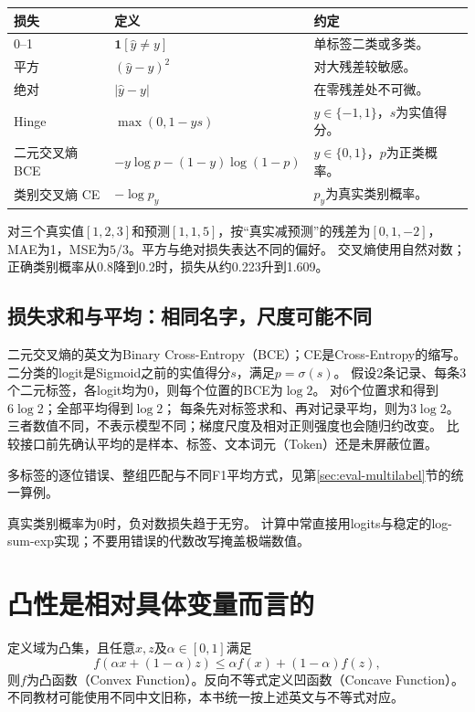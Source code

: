 \begin{center}
\begin{tabularx}{\textwidth}{P{29mm}P{62mm}Y}
\toprule
损失 & 定义 & 约定\\
--1 & $\mathbf1[\hat y\ne y]$ & 单标签二类或多类。\\
平方 & $(\hat y-y)^2$ & 对大残差较敏感。\\
绝对 & $|\hat y-y|$ & 在零残差处不可微。\\
Hinge & $\max(0,1-ys)$ & $y\in\{-1,1\}$，$s$为实值得分。\\
二元交叉熵 BCE & $-y\log p-(1-y)\log(1-p)$ & $y\in\{0,1\}$，$p$为正类概率。\\
类别交叉熵 CE & $-\log p_y$ & $p_y$为真实类别概率。\\
\bottomrule
\end{tabularx}
\end{center}

对三个真实值$[1,2,3]$和预测$[1,1,5]$，按“真实减预测”的残差为$[0,1,-2]$，
MAE为1，MSE为$5/3$。平方与绝对损失表达不同的偏好。
交叉熵使用自然对数；正确类别概率从0.8降到0.2时，损失从约0.223升到1.609。

\subsection{损失求和与平均：相同名字，尺度可能不同}
\label{sec:tools-reduction}
二元交叉熵的英文为Binary Cross-Entropy（BCE）；CE是Cross-Entropy的缩写。
二分类的logit是Sigmoid之前的实值得分$s$，满足$p=\sigma(s)$。
假设2条记录、每条3个二元标签，各logit均为0，则每个位置的BCE为$\log2$。
对6个位置求和得到$6\log2$；全部平均得到$\log2$；
每条先对标签求和、再对记录平均，则为$3\log2$。
三者数值不同，不表示模型不同；梯度尺度及相对正则强度也会随归约改变。
比较接口前先确认平均的是样本、标签、文本词元（Token）还是未屏蔽位置。

多标签的逐位错误、整组匹配与不同F1平均方式，见第\ref{sec:eval-multilabel}节的统一算例。

\begin{pitfall}[零概率的数值处理]
真实类别概率为0时，负对数损失趋于无穷。
计算中常直接用logits与稳定的log-sum-exp实现；不要用错误的代数改写掩盖极端数值。
\end{pitfall}

\section{凸性是相对具体变量而言的}
\label{sec:tools-convex}
定义域为凸集，且任意$x,z$及$\alpha\in[0,1]$满足
\[
 f(\alpha x+(1-\alpha)z)\leq\alpha f(x)+(1-\alpha)f(z),
\]
则$f$为凸函数（Convex Function）。反向不等式定义凹函数（Concave Function）。
不同教材可能使用不同中文旧称，本书统一按上述英文与不等式对应。

